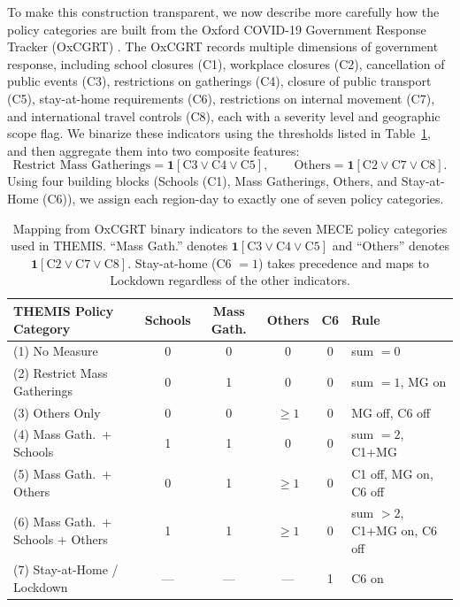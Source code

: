 \documentclass[letterpaper,twoside,11pt]{reviewresponse}
\begin{document}
\begin{enumerate}
To make this construction transparent, we now describe more carefully how the policy categories are built from the Oxford COVID-19 Government Response Tracker (OxCGRT) \cite{hale2021global}. The OxCGRT records multiple dimensions of government response, including school closures (C1), workplace closures (C2), cancellation of public events (C3), restrictions on gatherings (C4), closure of public transport (C5), stay-at-home requirements (C6), restrictions on internal movement (C7), and international travel controls (C8), each with a severity level and geographic scope flag. We binarize these indicators using the thresholds listed in Table~\ref{tab:oxford_mapping_r1}, and then aggregate them into two composite features:
\[
\text{Restrict Mass Gatherings} = \mathbf{1}[\text{C3} \lor \text{C4} \lor \text{C5}],
\qquad
\text{Others} = \mathbf{1}[\text{C2} \lor \text{C7} \lor \text{C8}].
\]
Using four building blocks (Schools (C1), Mass Gatherings, Others, and Stay-at-Home (C6)), we assign each region-day to exactly one of seven policy categories.

\begin{table}[htbp!]
	\centering
	\small
	\begin{tabular}{|l|c|c|c|c|l|}
		\hline
		\textbf{THEMIS Policy Category} & \textbf{Schools} & \textbf{Mass Gath.} & \textbf{Others} & \textbf{C6} & \textbf{Rule} \\\hline
		(1) No Measure & 0 & 0 & 0 & 0 & sum $= 0$ \\
		(2) Restrict Mass Gatherings & 0 & 1 & 0 & 0 & sum $= 1$, MG on \\
		(3) Others Only & 0 & 0 & $\geq 1$ & 0 & MG off, C6 off \\
		(4) Mass Gath.\ + Schools & 1 & 1 & 0 & 0 & sum $= 2$, C1+MG \\
		(5) Mass Gath.\ + Others & 0 & 1 & $\geq 1$ & 0 & C1 off, MG on, C6 off \\
		(6) Mass Gath.\ + Schools + Others & 1 & 1 & $\geq 1$ & 0 & sum $> 2$, C1+MG on, C6 off \\
		(7) Stay-at-Home / Lockdown & --- & --- & --- & 1 & C6 on \\\hline
	\end{tabular}
	\caption{Mapping from OxCGRT binary indicators to the seven MECE policy categories used in THEMIS. ``Mass Gath.'' denotes $\mathbf{1}[\text{C3} \lor \text{C4} \lor \text{C5}]$ and ``Others'' denotes $\mathbf{1}[\text{C2} \lor \text{C7} \lor \text{C8}]$. Stay-at-home (C6 $=1$) takes precedence and maps to Lockdown regardless of the other indicators.}
	\label{tab:oxford_mapping_r1}
\end{table}


\end{enumerate}
\end{document}
